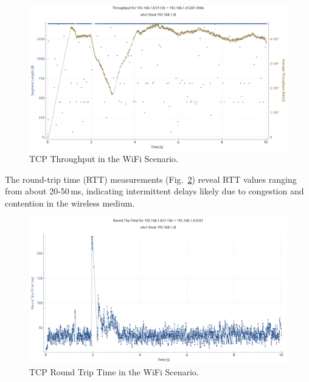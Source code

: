 \begin{enumerate}
                \begin{figure}[ht]
                    \centering
                    \includegraphics[width=0.9\columnwidth]{images/graphs/Throughput/Throughput_WiFi_TCP.pdf}
                    \caption{TCP Throughput in the WiFi Scenario. \vspace{0.2cm}} %
                    \label{fig:throughput-wifi-tcp}
                \end{figure}

                The round-trip time (RTT) measurements (Fig.~\ref{fig:rtt-wifi-tcp}) reveal RTT values ranging from about 20-50\,ms, indicating intermittent delays likely due to congestion and contention in the wireless medium.
                
                \begin{figure}[ht]
                    \centering
                    \includegraphics[width=0.9\columnwidth]{images/graphs/RTT/RTT_WiFi_TCP.pdf}
                    \caption{TCP Round Trip Time in the WiFi Scenario.}
                    \label{fig:rtt-wifi-tcp}
                \end{figure}    

                

\end{enumerate}
